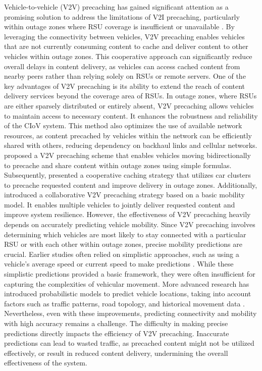 \documentclass{aims}
\numberwithin{equation}{section}
\begin{document}
Vehicle-to-vehicle (V2V) precaching has gained significant attention as a promising solution to address the limitations of V2I precaching, particularly within outage zones where RSU coverage is insufficient or unavailable \cite{Wang2017, Nam2023, Guo2017}. By leveraging the connectivity between vehicles, V2V precaching enables vehicles that are not currently consuming content to cache and deliver content to other vehicles within outage zones. This cooperative approach can significantly reduce overall delays in content delivery, as vehicles can access cached content from nearby peers rather than relying solely on RSUs or remote servers. One of the key advantages of V2V precaching is its ability to extend the reach of content delivery services beyond the coverage area of RSUs. In outage zones, where RSUs are either sparsely distributed or entirely absent, V2V precaching allows vehicles to maintain access to necessary content. It enhances the robustness and reliability of the CIoV system. This method also optimizes the use of available network resources, as content precached by vehicles within the network can be efficiently shared with others, reducing dependency on backhaul links and cellular networks. \cite{Wang2017} proposed a V2V precaching scheme that enables vehicles moving bidirectionally to precache and share content within outage zones using simple formulas. Subsequently, \cite{Guo2017} presented a cooperative caching strategy that utilizes car clusters to precache requested content and improve delivery in outage zones. Additionally, \cite{Nam2023} introduced a collaborative V2V precaching strategy based on a basic mobility model. It enables multiple vehicles to jointly deliver requested content and improve system resilience. However, the effectiveness of V2V precaching heavily depends on accurately predicting vehicle mobility. Since V2V precaching involves determining which vehicles are most likely to stay connected with a particular RSU or with each other within outage zones, precise mobility predictions are crucial. Earlier studies often relied on simplistic approaches, such as using a vehicle's average speed or current speed to make predictions \cite{Yao2020, Zhang2020}. While these simplistic predictions provided a basic framework, they were often insufficient for capturing the complexities of vehicular movement. More advanced research has introduced probabilistic models to predict vehicle locations, taking into account factors such as traffic patterns, road topology, and historical movement data \cite{Abani2017, Mahmood2019}. Nevertheless, even with these improvements, predicting connectivity and mobility with high accuracy remains a challenge. The difficulty in making precise predictions directly impacts the efficiency of V2V precaching. Inaccurate predictions can lead to wasted traffic, as precached content might not be utilized effectively, or result in reduced content delivery, undermining the overall effectiveness of the system.
\end{document}
